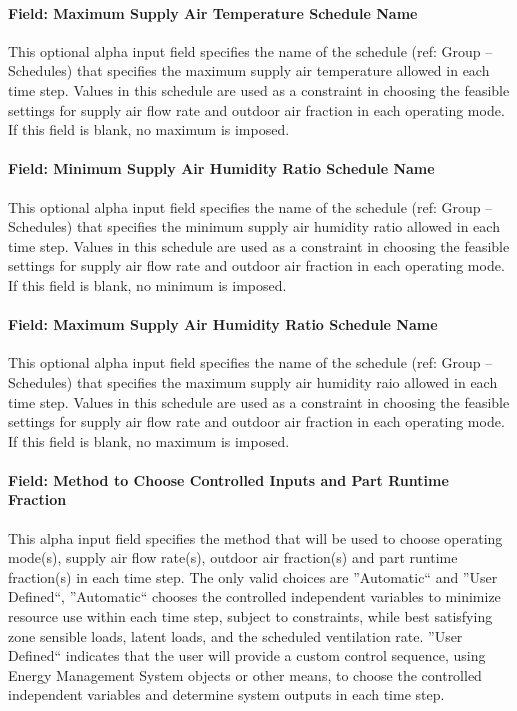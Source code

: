 \paragraph{Field: Maximum Supply Air Temperature Schedule Name}
This optional alpha input field specifies the name of the schedule (ref: Group – Schedules) that specifies the maximum supply air temperature allowed in each time step. Values in this schedule are used as a constraint in choosing the feasible settings for supply air flow rate and outdoor air fraction in each operating mode. If this field is blank, no maximum is imposed.

\paragraph{Field: Minimum Supply Air Humidity Ratio Schedule Name}
This optional alpha input field specifies the name of the schedule (ref: Group – Schedules) that specifies the minimum supply air humidity ratio allowed in each time step. Values in this schedule are used as a constraint in choosing the feasible settings for supply air flow rate and outdoor air fraction in each operating mode. If this field is blank, no minimum is imposed.

\paragraph{Field: Maximum Supply Air Humidity Ratio Schedule Name}
This optional alpha input field specifies the name of the schedule (ref: Group – Schedules) that specifies the maximum supply air humidity raio allowed in each time step. Values in this schedule are used as a constraint in choosing the feasible settings for supply air flow rate and outdoor air fraction in each operating mode. If this field is blank, no maximum is imposed.

\paragraph{Field: Method to Choose Controlled Inputs and Part Runtime Fraction}
This alpha input field specifies the method that will be used to choose operating mode(s), supply air flow rate(s), outdoor air fraction(s) and part runtime fraction(s) in each time step. The only valid choices are ''Automatic`` and ''User Defined``, ''Automatic`` chooses the controlled independent variables to minimize resource use within each time step, subject to constraints, while best satisfying zone sensible loads, latent loads, and the scheduled ventilation rate. ''User Defined`` indicates that the user will provide a custom control sequence, using Energy Management System objects or other means, to choose the controlled independent variables and determine system outputs in each time step.

